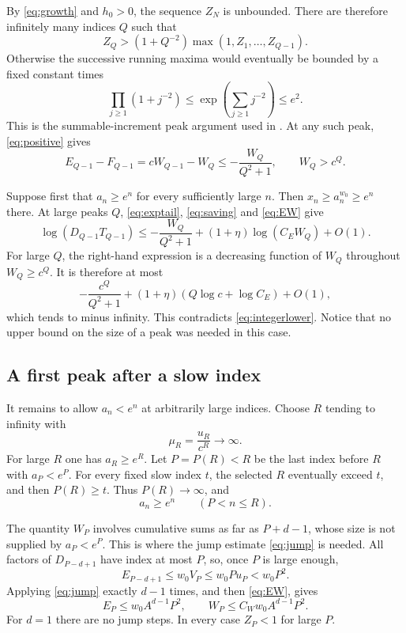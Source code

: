 \documentclass[11pt]{article}
\numberwithin{equation}{section}
\begin{document}
By \eqref{eq:growth} and $h_0>0$, the sequence $Z_N$ is unbounded.
There are therefore infinitely many indices $Q$ such that
\begin{equation}\label{eq:globalpeak}
  Z_Q>(1+Q^{-2})\max(1,Z_1,\ldots,Z_{Q-1}).
\end{equation}
Otherwise the successive running maxima would eventually be bounded
by a fixed constant times
\begin{equation}\label{eq:peakproduct}
  \prod_{j\ge1}(1+j^{-2})
  \le\exp\left(\sum_{j\ge1}j^{-2}\right)\le e^2.
\end{equation}
This is the summable-increment peak argument used in
\cite[Lemma~9]{BKKKZ}. At any such peak, \eqref{eq:positive} gives
\begin{equation}\label{eq:saving}
  E_{Q-1}-F_{Q-1}=cW_{Q-1}-W_Q
       \le-\frac{W_Q}{Q^2+1},\qquad W_Q>c^Q.
\end{equation}

Suppose first that $a_n\ge e^n$ for every sufficiently large $n$.
Then $x_n\ge a_n^{w_0}\ge e^n$ there. At large peaks $Q$,
\eqref{eq:exptail}, \eqref{eq:saving} and \eqref{eq:EW} give
\[
  \log(D_{Q-1}T_{Q-1})
  \le-\frac{W_Q}{Q^2+1}+(1+\eta)\log(C_EW_Q)+O(1).
\]
For large $Q$, the right-hand expression is a decreasing function of
$W_Q$ throughout $W_Q\ge c^Q$. It is therefore at most
\[
  -\frac{c^Q}{Q^2+1}+(1+\eta)(Q\log c+\log C_E)+O(1),
\]
which tends to minus infinity. This contradicts
\eqref{eq:integerlower}. Notice that no upper bound on the size of a
peak was needed in this case.

\subsection{A first peak after a slow index}

It remains to allow $a_n<e^n$ at arbitrarily large indices. Choose $R$
tending to infinity with
\begin{equation}\label{eq:mu}
  \mu_R=\frac{u_R}{c^R}\longrightarrow\infty.
\end{equation}
For large $R$ one has $a_R\ge e^R$. Let $P=P(R)<R$ be the last index
before $R$ with $a_P<e^P$. For every fixed slow index $t$, the selected
$R$ eventually exceed $t$, and then $P(R)\ge t$. Thus $P(R)\to\infty$,
and
\begin{equation}\label{eq:faststretch}
  a_n\ge e^n\qquad(P<n\le R).
\end{equation}

The quantity $W_P$ involves cumulative sums as far as $P+d-1$, whose
size is not supplied by $a_P<e^P$. This is where the jump estimate
\eqref{eq:jump} is needed. All factors of $D_{P-d+1}$ have index at
most $P$, so, once $P$ is large enough,
\[
  E_{P-d+1}\le w_0V_P\le w_0P u_P<w_0P^2.
\]
Applying \eqref{eq:jump} exactly $d-1$ times, and then \eqref{eq:EW}, gives
\begin{equation}\label{eq:slowcontrol}
  E_P\le w_0A^{d-1}P^2,\qquad
  W_P\le C_Ww_0A^{d-1}P^2.
\end{equation}
For $d=1$ there are no jump steps. In every case $Z_P<1$ for large $P$.
\end{document}
